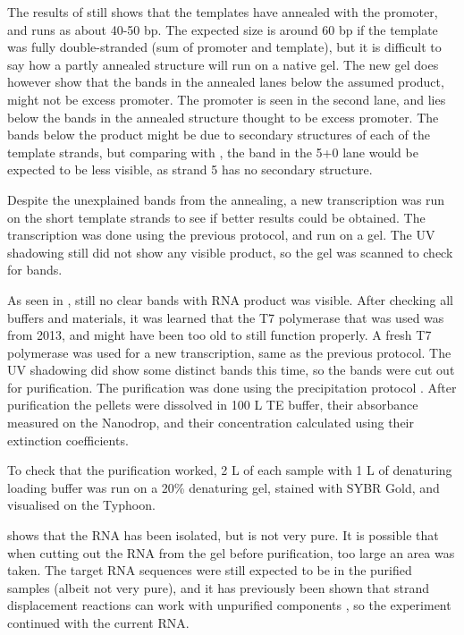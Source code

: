The results of  still shows that the templates have annealed with the promoter, and runs as about 40-50 bp. The expected size is around 60 bp if the template was fully double-stranded (sum of promoter and template), but it is difficult to say how a partly annealed structure will run on a native gel. The new gel does however show that the bands in the annealed lanes below the assumed product, might not be excess promoter. The promoter is seen in the second lane, and lies below the bands in the annealed structure thought to be excess promoter. The bands below the product might be due to secondary structures of each of the template strands, but comparing with , the band in the 5+0 lane would be expected to be less visible, as strand 5 has no secondary structure.

Despite the unexplained bands from the annealing, a new transcription was run on the short template strands to see if better results could be obtained. The transcription was done using the previous protocol, and run on a gel. The UV shadowing still did not show any visible product, so the gel was scanned to check for bands.

As seen in , still no clear bands with RNA product was visible. After checking all buffers and materials, it was learned that the T7 polymerase that was used was from 2013, and might have been too old to still function properly. A fresh T7 polymerase was used for a new transcription, same as the previous protocol. The UV shadowing did show some distinct bands this time, so the bands were cut out for purification. The purification was done using the precipitation protocol \cite{precipitationprotocol}. After purification the pellets were dissolved in 100 \si{\micro}L TE buffer, their absorbance measured on the Nanodrop, and their concentration calculated using their extinction coefficients.

To check that the purification worked, 2 \si{\micro}L of each sample with 1 \si{\micro}L of denaturing loading buffer was run on a 20\% denaturing gel, stained with SYBR Gold, and visualised on the Typhoon.

 shows that the RNA has been isolated, but is not very pure. It is possible that when cutting out the RNA from the gel before purification, too large an area was taken. The target RNA sequences were still expected to be in the purified samples (albeit not very pure), and it has previously been shown that strand displacement reactions can work with unpurified components \cite{Thubagere2017}, so the experiment continued with the current RNA.

